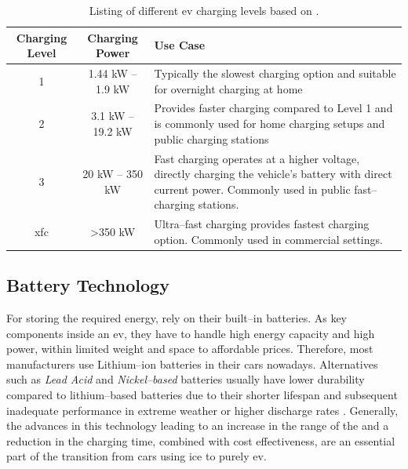 \begingroup
\setlength{\tabcolsep}{10pt} %
\renewcommand{\arraystretch}{1.5} %
\begin{table}[h]
    \centering
    \caption{Listing of different \acrshort{ev} charging levels based on \cite{acharige_review_2023}.}
    \begin{tabular}{c|c|m{6.5cm}}
        Charging Level & Charging Power & Use Case \\ \hline
         1 & 1.44 kW -- 1.9 kW & Typically the slowest charging option and suitable for overnight charging at home \\
         2 & 3.1 kW -- 19.2 kW & Provides faster charging compared to Level 1 and is commonly used for home charging setups and public charging stations \\
         3 & 20 kW -- 350 kW & Fast charging operates at a higher voltage, directly charging the vehicle's battery with direct current power. Commonly used in public fast--charging stations.\\
         \acrshort{xfc} & >350 kW & Ultra--fast charging provides fastest charging option. Commonly used in commercial settings. 
    \end{tabular}
    \label{tab:ev-charging-levels}
\end{table}
\endgroup

\newpage

\subsection{Battery Technology}
\label{ch:Fundamentals:sec:Electric Mobility:ssec:Battery Technology}

For storing the required energy,  rely on their built--in batteries. As key components inside an \acrshort{ev}, they have to handle high energy capacity and high power, within limited weight and space to affordable prices.
Therefore, most manufacturers use Lithium--ion batteries in their cars nowadays. 
Alternatives such as \textit{Lead Acid} and \textit{Nickel--based} batteries usually have lower durability compared to lithium--based batteries due to their shorter lifespan and subsequent inadequate performance in extreme weather or higher discharge rates \cite{acharige_review_2023}.
Generally, the advances in this technology leading to an increase in the range of the  and a reduction in the charging time, combined with cost effectiveness, are an essential part of the transition from cars using \acrshort{ice} to purely \acrshort{ev}.

